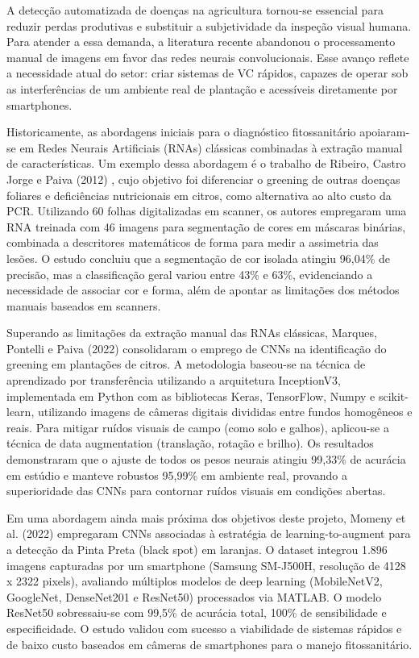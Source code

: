 \documentclass[11pt,a4paper]{article}
\begin{document}
A detecção automatizada de doenças na agricultura tornou-se essencial para reduzir perdas produtivas e substituir a subjetividade da inspeção visual humana. Para atender a essa demanda, a literatura recente abandonou o processamento manual de imagens em favor das redes neurais convolucionais. Esse avanço reflete a necessidade atual do setor: criar sistemas de VC rápidos, capazes de operar sob as interferências de um ambiente real de plantação e acessíveis diretamente por smartphones.

Historicamente, as abordagens iniciais para o diagnóstico fitossanitário apoiaram-se em Redes Neurais Artificiais (RNAs) clássicas combinadas à extração manual de características. Um exemplo dessa abordagem é o trabalho de Ribeiro, Castro Jorge e Paiva (2012) \cite{Ribeiro2012}, cujo objetivo foi diferenciar o greening de outras doenças foliares e deficiências nutricionais em citros, como alternativa ao alto custo da PCR. Utilizando 60 folhas digitalizadas em scanner, os autores empregaram uma RNA treinada com 46 imagens para segmentação de cores em máscaras binárias, combinada a descritores matemáticos de forma para medir a assimetria das lesões. O estudo concluiu que a segmentação de cor isolada atingiu 96,04\% de precisão, mas a classificação geral variou entre 43\% e 63\%, evidenciando a necessidade de associar cor e forma, além de apontar as limitações dos métodos manuais baseados em scanners.

Superando as limitações da extração manual das RNAs clássicas, Marques, Pontelli e Paiva (2022) \cite{Marques2022} consolidaram o emprego de CNNs na identificação do greening em plantações de citros. A metodologia baseou-se na técnica de aprendizado por transferência utilizando a arquitetura InceptionV3, implementada em Python com as bibliotecas Keras, TensorFlow, Numpy e scikit-learn, utilizando imagens de câmeras digitais divididas entre fundos homogêneos e reais. Para mitigar ruídos visuais de campo (como solo e galhos), aplicou-se a técnica de data augmentation (translação, rotação e brilho). Os resultados demonstraram que o ajuste de todos os pesos neurais atingiu 99,33\% de acurácia em estúdio  e manteve robustos 95,99\% em ambiente real, provando a superioridade das CNNs para contornar ruídos visuais em condições abertas. 

Em uma abordagem ainda mais próxima dos objetivos deste projeto, Momeny et al. (2022) \cite{Momeny2022} empregaram CNNs associadas à estratégia de learning-to-augment para a detecção da Pinta Preta (black spot) em laranjas. O dataset integrou 1.896 imagens capturadas por um smartphone (Samsung SM-J500H, resolução de 4128 x 2322 pixels), avaliando múltiplos modelos de deep learning (MobileNetV2, GoogleNet, DenseNet201 e ResNet50) processados via MATLAB. O modelo ResNet50 sobressaiu-se com 99,5\% de acurácia total, 100\% de sensibilidade e especificidade. O estudo validou com sucesso a viabilidade de sistemas rápidos e de baixo custo baseados em câmeras de smartphones para o manejo fitossanitário.
\end{document}
